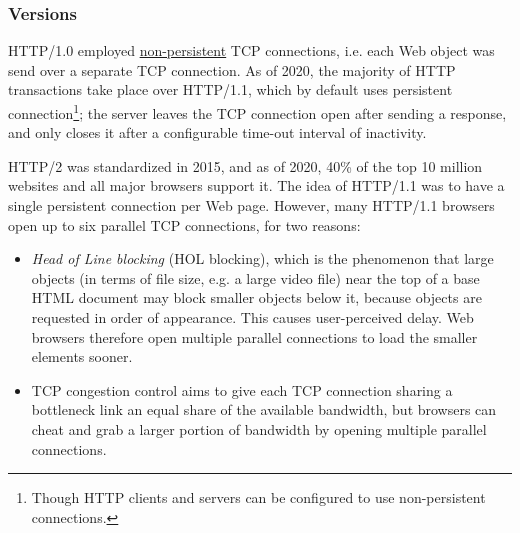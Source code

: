 \documentclass[table, xcdraw]{article}%
\begin{document}
\subsubsection{Versions}

HTTP/1.0 employed \hyperref[ch:transport:tcp]{non-persistent} TCP connections, i.e. each Web object was send over a separate TCP connection. As of 2020, the majority of HTTP transactions take place over HTTP/1.1, which by default uses persistent connection\footnote{Though HTTP clients and servers can be configured to use non-persistent connections.}; the server leaves the TCP connection open after sending a response, and only closes it after a configurable time-out interval of inactivity.

HTTP/2 was standardized in 2015, and as of 2020, 40\% of the top 10 million websites and all major browsers support it. The idea of HTTP/1.1 was to have a single persistent connection per Web page. However, many HTTP/1.1 browsers open up to six parallel TCP connections, for two reasons:

\begin{itemize}
	\item \emph{Head of Line blocking} (HOL blocking), which is the phenomenon that large objects (in terms of file size, e.g. a large video file) near the top of a base HTML document may block smaller objects below it, because objects are requested in order of appearance. This causes user-perceived delay. Web browsers therefore open multiple parallel connections to load the smaller elements sooner.
	\item TCP congestion control aims to give each TCP connection sharing a bottleneck link an equal share of the available bandwidth, but browsers can cheat and grab a larger portion of bandwidth by opening multiple parallel connections.
\end{itemize}
\end{document}
